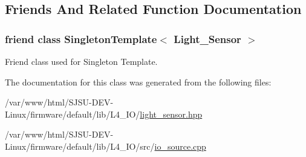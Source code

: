 \subsection{Friends And Related Function Documentation}
\subsubsection[{\texorpdfstring{Singleton\+Template$<$ Light\+\_\+\+Sensor $>$}{SingletonTemplate< Light_Sensor >}}]{\setlength{\rightskip}{0pt plus 5cm}friend class {\bf Singleton\+Template}$<$ {\bf Light\+\_\+\+Sensor} $>$\hspace{0.3cm}{\ttfamily [friend]}}\hypertarget{classLight__Sensor_a27b0e5f4de88754c9f4620bf0029f6de}{}\label{classLight__Sensor_a27b0e5f4de88754c9f4620bf0029f6de}


Friend class used for Singleton Template. 



The documentation for this class was generated from the following files\+:\begin{DoxyCompactItemize}
\item 
/var/www/html/\+S\+J\+S\+U-\/\+D\+E\+V-\/\+Linux/firmware/default/lib/\+L4\+\_\+\+I\+O/\hyperlink{light__sensor_8hpp}{light\+\_\+sensor.\+hpp}\item 
/var/www/html/\+S\+J\+S\+U-\/\+D\+E\+V-\/\+Linux/firmware/default/lib/\+L4\+\_\+\+I\+O/src/\hyperlink{io__source_8cpp}{io\+\_\+source.\+cpp}\end{DoxyCompactItemize}
